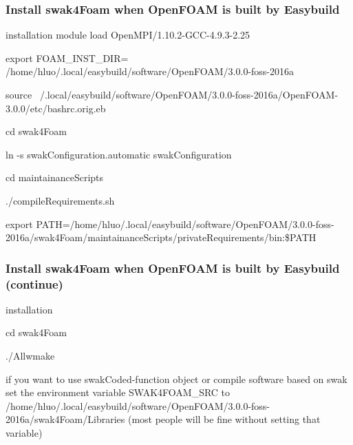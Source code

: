 \documentclass{beamer}
\begin{document}
\begin{frame}
\frametitle{Install swak4Foam when OpenFOAM is built by Easybuild}

\begin{block}{installation}
module load OpenMPI/1.10.2-GCC-4.9.3-2.25

export FOAM\_INST\_DIR= \\
/home/hluo/.local/easybuild/software/OpenFOAM/3.0.0-foss-2016a

source ~/.local/easybuild/software/OpenFOAM/3.0.0-foss-2016a/OpenFOAM-3.0.0/etc/bashrc.orig.eb

cd swak4Foam

ln -s swakConfiguration.automatic swakConfiguration

cd maintainanceScripts

./compileRequirements.sh

export PATH=/home/hluo/.local/easybuild/software/OpenFOAM/3.0.0-foss-2016a/swak4Foam/maintainanceScripts/privateRequirements/bin:\$PATH

\end{block}

\end{frame}

\begin{frame}
\frametitle{Install swak4Foam when OpenFOAM is built by Easybuild (continue)}

\begin{block}{installation}

cd swak4Foam

./Allwmake

if you want to use swakCoded-function object or compile software based on swak set the environment variable SWAK4FOAM\_SRC to /home/hluo/.local/easybuild/software/OpenFOAM/3.0.0-foss-2016a/swak4Foam/Libraries (most people will be fine without setting that variable)

\end{block}

\end{frame}

\end{document}
